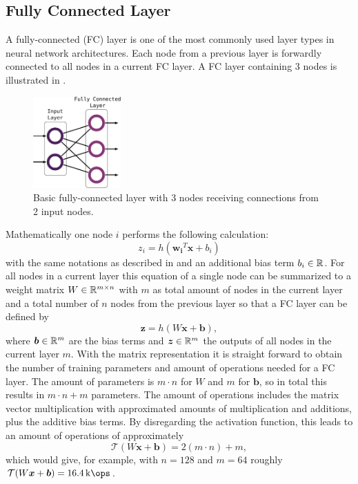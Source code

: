 
\subsection{Fully Connected Layer}
A fully-connected (FC) layer is one of the most commonly used layer types in neural network architectures.
Each node from a previous layer is forwardly connected to all nodes in a current FC layer.
A FC layer containing 3 nodes is illustrated in .
\begin{figure}[!ht]
  \centering
    \includegraphics[width=0.30\textwidth]{./4_nn/figs/nn_theory_fc.pdf}
  \caption{Basic fully-connected layer with 3 nodes receiving connections from 2 input nodes.}
  \label{fig:nn_theory_fc}
\end{figure}
\FloatBarrier
\noindent
Mathematically one node $i$ performs the following calculation:
\begin{equation}
  z_i = h(\bm{w_i}^T \bm{x} + b_i)
\end{equation}
with the same notations as described in  and an additional bias term $b_i \in \mathbb{R}$.
For all nodes in a current layer this equation of a single node can be summarized to a weight matrix $W \in \mathbb{R}^{m \times n}$ with $m$ as total amount of nodes in the current layer and a total number of $n$ nodes from the previous layer so that a FC layer can be defined by
\begin{equation}
  \bm{z} = h(W \bm{x} + \bm{b}),
\end{equation}
where $\bm{b} \in \mathbb{R}^m$ are the bias terms and $\bm{z} \in \mathbb{R}^m$ the outputs of all nodes in the current layer $m$.
With the matrix representation it is straight forward to obtain the number of training parameters and amount of operations needed for a FC layer.
The amount of parameters is $m \cdot n$ for $W$ and $m$ for $\bm{b}$, so in total this results in $m \cdot n + m$ parameters.
The amount of operations includes the matrix vector multiplication with approximated amounts of multiplication and additions, plus the additive bias terms.
By disregarding the activation function, this leads to an amount of operations of approximately
\begin{equation} 
  \mathcal{T}(W \bm{x} + \bm{b}) = 2 (m \cdot n) + m,
\end{equation}
which would give, for example, with $n = 128$ and $m = 64$ roughly $\mathcal{T}(W \bm{x} + \bm{b}) = \SI{16.4}{\kilo\ops}$.


